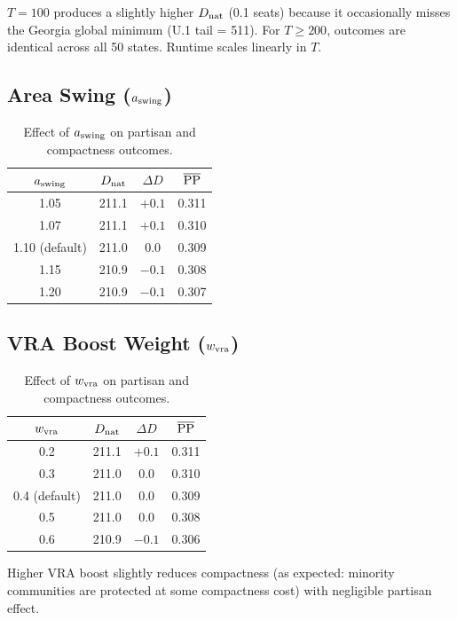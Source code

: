 $T = 100$ produces a slightly higher $D_{\rm nat}$ (0.1 seats) because
it occasionally misses the Georgia global minimum (U.1 tail = 511).
For $T \geq 200$, outcomes are identical across all 50 states.
Runtime scales linearly in $T$.

\subsection{Area Swing ($a_{\mathrm{swing}}$)}

\begin{table}[h]
\centering
\caption{Effect of $a_{\mathrm{swing}}$ on partisan and compactness outcomes.}
\label{tab:aswing-results}
\begin{tabular}{cccc}
\toprule
$a_{\mathrm{swing}}$ & $D_{\rm nat}$ & $\Delta D$ & $\overline{\mathrm{PP}}$ \\
\midrule
1.05 & 211.1 & $+0.1$ & 0.311 \\
1.07 & 211.1 & $+0.1$ & 0.310 \\
1.10 (default) & 211.0 & 0.0 & 0.309 \\
1.15 & 210.9 & $-0.1$ & 0.308 \\
1.20 & 210.9 & $-0.1$ & 0.307 \\
\bottomrule
\end{tabular}
\end{table}

\subsection{VRA Boost Weight ($w_{\mathrm{vra}}$)}

\begin{table}[h]
\centering
\caption{Effect of $w_{\mathrm{vra}}$ on partisan and compactness outcomes.}
\label{tab:wvra-results}
\begin{tabular}{cccc}
\toprule
$w_{\mathrm{vra}}$ & $D_{\rm nat}$ & $\Delta D$ & $\overline{\mathrm{PP}}$ \\
\midrule
0.2 & 211.1 & $+0.1$ & 0.311 \\
0.3 & 211.0 &  0.0   & 0.310 \\
0.4 (default) & 211.0 & 0.0 & 0.309 \\
0.5 & 211.0 &  0.0   & 0.308 \\
0.6 & 210.9 & $-0.1$ & 0.306 \\
\bottomrule
\end{tabular}
\end{table}

Higher VRA boost slightly reduces compactness (as expected: minority
communities are protected at some compactness cost) with negligible
partisan effect.

